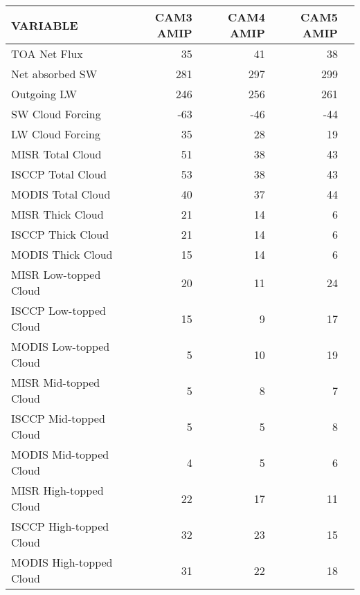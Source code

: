 \begin{tabular}{lrrrr}
\hline
                VARIABLE &                CAM3 AMIP &                CAM4 AMIP &                CAM5 AMIP \\ \hline
            TOA Net Flux &                       35 &                       41 &                       38 \\
         Net absorbed SW &                      281 &                      297 &                      299 \\
             Outgoing LW &                      246 &                      256 &                      261 \\
        SW Cloud Forcing &                      -63 &                      -46 &                      -44 \\
        LW Cloud Forcing &                       35 &                       28 &                       19 \\
        MISR Total Cloud &                       51 &                       38 &                       43 \\
       ISCCP Total Cloud &                       53 &                       38 &                       43 \\
       MODIS Total Cloud &                       40 &                       37 &                       44 \\
        MISR Thick Cloud &                       21 &                       14 &                        6 \\
       ISCCP Thick Cloud &                       21 &                       14 &                        6 \\
       MODIS Thick Cloud &                       15 &                       14 &                        6 \\
   MISR Low-topped Cloud &                       20 &                       11 &                       24 \\
  ISCCP Low-topped Cloud &                       15 &                        9 &                       17 \\
  MODIS Low-topped Cloud &                        5 &                       10 &                       19 \\
   MISR Mid-topped Cloud &                        5 &                        8 &                        7 \\
  ISCCP Mid-topped Cloud &                        5 &                        5 &                        8 \\
  MODIS Mid-topped Cloud &                        4 &                        5 &                        6 \\
  MISR High-topped Cloud &                       22 &                       17 &                       11 \\
 ISCCP High-topped Cloud &                       32 &                       23 &                       15 \\
 MODIS High-topped Cloud &                       31 &                       22 &                       18 \\ \hline
\end{tabular}

